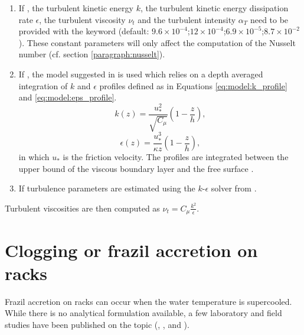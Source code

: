 \begin{enumerate}
\item If , 
the turbulent kinetic energy $k$, the turbulent kinetic energy dissipation rate $\epsilon$,
the turbulent viscosity $\nu_{t}$ and the turbulent intensity $\alpha_{T}$ need 
to be provided with the keyword
 (default: $9.6 \times 10^{-4}$;$12 \times 10^{-4}$;$6.9 \times 10^{-5}$;$8.7 \times 10^{-2}$).
These constant parameters will only affect the computation of the Nusselt number
 (cf. section \ref{paragraph:nusselt}).
\item If , the model
suggested in \cite{shen_JHR_2010} is used which
relies on a depth averaged integration of $k$ and $\epsilon$
profiles defined as in Equations \eqref{eq:model:k_profile} and \eqref{eq:model:eps_profile}.
\begin{equation}
k(z)=\frac{u_{*}^{2}}{\sqrt{C_{\mu}}}(1-\frac{z}{h}),
\label{eq:model:k_profile}
\end{equation}
\begin{equation}
\epsilon (z)=\frac{u_{*}^{3}}{\kappa z }(1-\frac{z}{h}),
\label{eq:model:eps_profile}
\end{equation}
in which $u_{*}$ is the friction velocity.
The profiles are integrated between the upper bound of the
viscous boundary layer and the free surface \cite{shen_JHR_2010}.
\item If  turbulence parameters
are estimated using the $k$-$\epsilon$ solver from .
\end{enumerate}

Turbulent viscosities are then computed as $\nu_{t} = C_{\mu} \frac{k^2}{\epsilon}$.

\section{Clogging or frazil accretion on racks}
\label{chapter:clogging}

Frazil accretion on racks can occur when the water temperature is supercooled. While there is no analytical formulation available, a few laboratory and field studies have been published on the topic (\cite{daly1991frazil}, \cite{andersson1992frazil}, \cite{andersson1992laboratory} and \cite{richard2008multiple}).\newline

